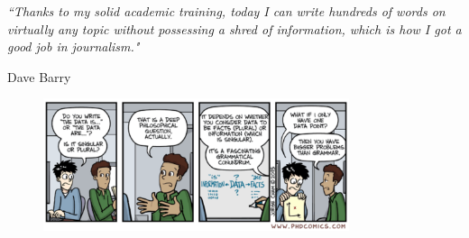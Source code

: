\thispagestyle{empty} %

\null\vfill %

\textit{``Thanks to my solid academic training, today I can write hundreds of words on virtually any topic without possessing a shred of information, which is how I got a good job in journalism."}

\begin{flushright}
Dave Barry
\end{flushright}

\begin{figure}[h!]
  \centering
    \includegraphics[width=0.8\textwidth]{figures/phd_comic.pdf}
\end{figure}

\vfill\vfill\vfill\vfill\vfill\vfill\null %

\cleardoublepage %
